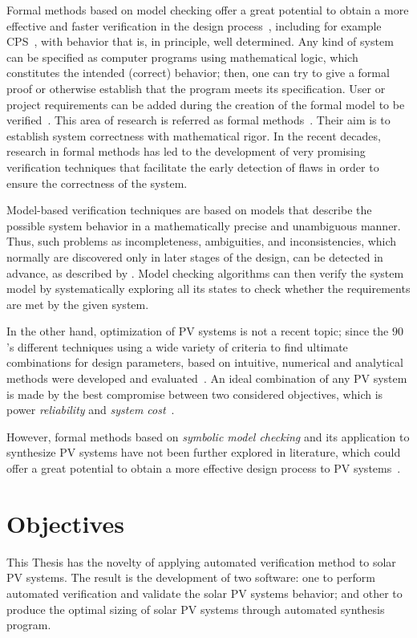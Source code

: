 Formal methods based on model checking offer a great potential to obtain a more effective and faster verification in the design process~\cite{ClarkeHV18}, including for example CPS~\cite{Abateetal2017,AbateBCCDKK17,Bessa,ChavesBCKF17}, with behavior that is, in principle, well determined. 
Any kind of system can be specified as computer programs using mathematical logic, which constitutes the intended (correct) behavior; then, one can try to give a formal proof or otherwise establish that the program meets its specification. User or project requirements can be added during the creation of the formal model to be verified~\cite{Trindade}. 
%
This area of research is referred as formal methods~\cite{Clarkeetal}. Their aim is to establish system correctness with mathematical rigor. 
In the recent decades, research in formal methods has led to the development of very promising verification techniques that facilitate the early detection of flaws in order to ensure the correctness of the system. 

Model-based verification techniques are based on models that describe the possible system behavior in a mathematically precise and unambiguous manner. Thus, such problems as incompleteness, ambiguities, and inconsistencies, which normally are discovered only in later stages of the design, can be detected in advance, as described by \cite{Trindade}. 
Model checking algorithms can then verify the system model by systematically exploring all its states to check whether the requirements are met by the given system.
%
%

In the other hand, optimization of PV systems is not a recent topic; since the $90$'s different techniques using a wide variety of criteria to find ultimate combinations for design parameters, based on intuitive, numerical and analytical methods were developed and evaluated~\cite{Applasamy2011}. An ideal combination of any PV system is made by the best compromise between two considered objectives, which is power \textit{reliability} and \textit{system cost}~\cite{Alsadi2018}.
 
However, formal methods based on \textit{symbolic model checking} and its application 
to synthesize PV systems have not been further explored in literature, which could offer 
a great potential to obtain a more effective design process to PV systems~\cite{ClarkeHV18}.


\section{Objectives}
This Thesis has the novelty of applying automated verification method to solar PV systems. The result is the development of two software: one to perform automated verification and validate the solar PV systems behavior; and other to produce the optimal sizing of solar PV systems through automated synthesis program.

